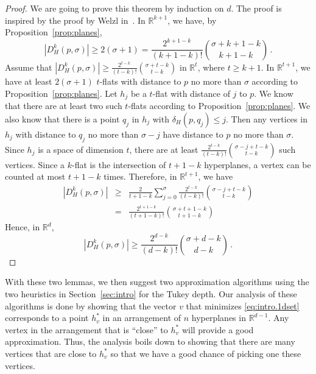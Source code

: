\documentclass{patmorin}
\begin{document}
\begin{proof}%
  We are going to prove this theorem by induction on $d$. The proof is inspired by the proof by Welzl in~\cite{welzl92}. In $\mathbb{R}^{k+1}$, we have, by Proposition~\ref{prop:planes},
  \begin{equation}
    |D_{H}^{k}(p,\sigma)| \geq 2(\sigma+1) = \frac{2^{k+1-k}}{(k+1-k)!}\binom{\sigma + k+1-k}{k+1-k} \, . \nonumber
  \end{equation}
  Assume that $|D_{H}^{k}(p,\sigma)| \geq \frac{2^{t-k}}{(t-k)!}\binom{\sigma + t-k}{t-k}$ in $\mathbb{R}^{t}$, where $t \geq k + 1$. In $\mathbb{R}^{t+1}$, we have at least $2(\sigma+1)$ $t$-flats with distance to $p$ no more than $\sigma$ according to Proposition~\ref{prop:planes}. Let $h_{j}$ be a $t$-flat with distance of $j$ to $p$. We know that there are at least two such $t$-flats according to Proposition~\ref{prop:planes}. We also know that there is a point $q_{j}$ in $h_{j}$ with $\delta_{H}(p,q_{j}) \leq j$. Then any vertices in $h_{j}$ with distance to $q_{j}$ no more than $\sigma - j$ have distance to $p$ no more than $\sigma$. Since $h_{j}$ is a space of dimension $t$, there are at least $\frac{2^{t-k}}{(t-k)!}\binom{\sigma - j + t-k}{t-k}$ such vertices. Since a $k$-flat is the intersection of $t+1-k$ hyperplanes, a vertex can be counted at most $t+1-k$ times. Therefore, in $\mathbb{R}^{t+1}$, we have
  \begin{eqnarray}
    |D_{H}^{k}(p,\sigma)| & \geq & \frac{2}{t+1-k}\sum_{j=0}^{\sigma}\frac{2^{t-k}}{(t-k)!}\binom{\sigma - j + t-k}{t-k} \nonumber \\
    & = & \frac{2^{t+1-k}}{(t+1-k)!}\binom{\sigma + t + 1 - k}{t+1-k} \nonumber
  \end{eqnarray}
  Hence, in $\mathbb{R}^{d}$,
  \begin{equation}
    |D_{H}^{k}(p,\sigma)| \geq \frac{2^{d-k}}{(d-k)!}\binom{\sigma + d-k}{d-k} \, . \nonumber
  \end{equation}
\end{proof}

With these two lemmas, we then suggest two approximation algorithms using the two heuristics in Section~\ref{sec:intro} for the Tukey depth. Our analysis of these algorithms is done by showing that the vector $v$ that minimizes \eqref{eq:intro.1dset} corresponds to a point $h_{v}^{*}$ in an arrangement of $n$ hyperplanes in $\mathbb{R}^{d-1}$. Any vertex in the arrangement that is ``close'' to $h_{v}^{*}$ will provide a good approximation. Thus, the analysis boils down to showing that there are many vertices that are close to $h_{v}^{*}$ so that we have a good chance of picking one these vertices.
\end{document}
